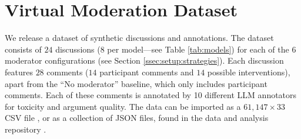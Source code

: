 %

\section{Virtual Moderation Dataset}

We release a dataset of synthetic discussions and annotations. The dataset consists of $24$ discussions ($8$ per model—see Table \ref{tab:models}) for each of the $6$ moderator configurations (see Section \ref{ssec:setup:strategies}). Each discussion features $28$ comments ($14$ participant comments and $14$ possible interventions), apart from the “No moderator” baseline, which only includes participant comments. Each of these comments is annotated by 10 different \ac{LLM} annotators for toxicity and argument quality. The data can be imported as a $61,147 \times 33$ CSV file \datasetlink, or as a collection of JSON files, found in the data and analysis repository \analysislink.


